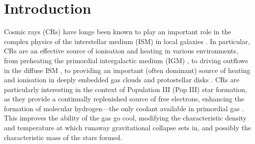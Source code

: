 \section{Introduction}
\label{intro}

Cosmic rays (CRs) have longe been known to play an important role in the complex physics of the interstellar medium (ISM) in local galaxies \citep{GlassgoldLanger1973,GoldsmithLanger1978,CravensDalgarno1978,MannheimSchlickeiser1994,DalgarnoYanLiu1999}.  In particular, CRs are an effective source of ionisation and heating in various environments, from preheating the primordial intergalactic medium (IGM) \citep{SazonovSunyaev2015}, to driving outflows in the diffuse ISM \citep{e.g.,Ensslinetal2007,Jubelgasetal2008,SalemBryan2014,Hanaszetal2013,Boothetal2013,SalemBryanHummels2014}, to providing an important (often dominant) source of heating and ionisation in deeply embedded gas clouds and protostellar disks \citep{IndrioloFieldsMcCall2009,PadovaniGalliGlassgold2009,PadovaniHennebelleGalli2013,Padovanietal2015,GlassgoldGalliPadovani2012}. CRs are particularly interesting in the context of Population III (Pop III) star formation, as they provide a continually replenished source of free electrons, enhancing the formation of molecular hydrogen---the only coolant available in primordial gas \citep{Abeletal1997,GalliPalla1998,BrommCoppiLarson2002}.  This improves the ability of the gas go cool, modifying the characteristic density and temperature at which runaway gravitational collapse sets in, and possibly the characteristic mass of the stars formed.  
